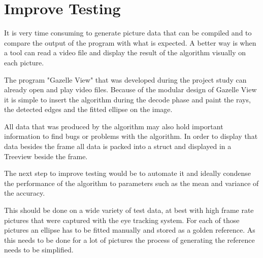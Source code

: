 \section{Improve Testing}
\label{sec:improveTesting}
It is very time consuming to generate picture data that can be compiled and to compare the output of the program with what is expected. A better way is when a tool can read a video file and display the result of the algorithm visually on each picture. 

The program "Gazelle View" that was developed during the project study can already open and play video files. Because of the modular design of Gazelle View it is simple to insert the algorithm during the decode phase and paint the rays, the detected edges and the fitted ellipse on the image.

All data that was produced by the algorithm may also hold important information to find bugs or problems with the algorithm. In order to display that data besides the frame all data is packed into a struct and displayed in a Treeview beside the frame. 

The next step to improve testing would be to automate it and ideally condense the performance of the algorithm to parameters such as the mean and variance of the accuracy.

This should be done on a wide variety of test data, at best with high frame rate pictures that were captured with the eye tracking system. For each of those pictures an ellipse has to be fitted manually and stored as a golden reference. As this needs to be done for a lot of pictures the process of generating the reference needs to be simplified.
